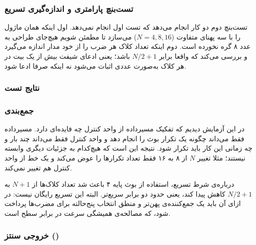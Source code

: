 \documentclass[10pt,a4paper]{article}
\begin{document}
\begin{latin}

\end{latin}

\subsubsection*{تست‌بنچ پارامتری و اندازه‌گیری تسریع}

تست‌بنچ دوم دو کار انجام می‌دهد که تست اول انجام نمی‌دهد. اول اینکه همان ماژول را با سه پهنای متفاوت ($N = 4, 8, 16$) می‌سازد تا مطمئن شویم هیچ‌جای طراحی به عدد ۸ گره نخورده است. دوم اینکه تعداد کلاک هر ضرب را از خود مدار {اندازه می‌گیرد} و بررسی می‌کند که واقعا برابر $N/2 + 1$ باشد؛ یعنی ادعای شیفت بیش از یک بیت در هر کلاک به‌صورت عددی اثبات می‌شود نه اینکه صرفا ادعا شود.

\begin{latin}

\end{latin}

\subsubsection*{نتایج تست}

\begin{latin}

\end{latin}

\subsubsection*{جمع‌بندی}

در این آزمایش دیدیم که تفکیک {مسیرداده} از {واحد کنترل} چه فایده‌ای دارد. مسیرداده فقط می‌داند چگونه یک تکرار بوث را انجام دهد و واحد کنترل فقط می‌داند چند بار و چه زمانی این کار باید تکرار شود. نتیجه این است که هیچ‌کدام به جزئیات دیگری وابسته نیستند؛ مثلا تغییر $N$ از ۸ به ۱۶ فقط تعداد تکرارها را عوض می‌کند و یک خط از واحد کنترل هم تغییر نمی‌کند.

درباره‌ی شرط تسریع، استفاده از بوث پایه ۴ باعث شد تعداد کلاک‌ها از $N+1$ به $N/2+1$ کاهش پیدا کند، یعنی حدود دو برابر سریع‌تر. البته این تسریع رایگان نیست: در ازای آن باید یک جمع‌کننده‌ی پهن‌تر و منطق انتخاب پنج‌حالته برای مضرب‌ها پرداخت شود، که مصالحه‌ی همیشگی {سرعت در برابر سطح} است.

\pagebreak
\subsubsection*{خروجی سنتز ()}
\end{document}

